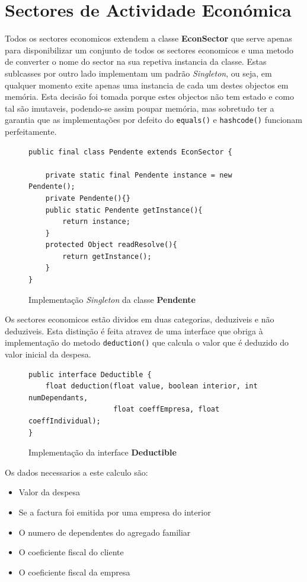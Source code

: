 \documentclass[12pt,a4paper]{report}
\begin{document}
\pagebreak

    \section{Sectores de Actividade Económica}
    Todos os sectores economicos extendem a classe \textbf{EconSector} que serve
    apenas para disponibilizar um conjunto de todos os sectores economicos e uma
    metodo de converter o nome do sector na sua repetiva instancia da classe.
    Estas sublcasses por outro lado implementam um padrão \textit{Singleton}, ou
    seja, em qualquer momento exite apenas uma instancia de cada um destes
    objectos em memória. Esta decisão foi tomada porque estes objectos não tem
    estado e como tal são imutaveis, podendo-se assim poupar memória, mas
    sobretudo ter a garantia que as implementações por defeito do
    \texttt{equals()} e \texttt{hashcode()} funcionam
    perfeitamente.
    \begin{figure}[h]
        \begin{verbatim}
public final class Pendente extends EconSector {

    private static final Pendente instance = new Pendente();
    private Pendente(){}
    public static Pendente getInstance(){
        return instance;
    }
    protected Object readResolve(){
        return getInstance();
    }
}
        \end{verbatim}
        \caption{Implementação \textit{Singleton} da classe \textbf{Pendente}}
        \label{fig:singleton}
    \end{figure}

    Os sectores economicos estão dividos em duas categorias, deduziveis
    e não deduziveis. Esta distinção é feita atravez de uma interface que
    obriga à implementação do metodo \texttt{deduction()} que calcula
    o valor que é deduzido do valor inicial da despesa.
    \begin{figure}[h]
        \begin{verbatim}
public interface Deductible {
    float deduction(float value, boolean interior, int numDependants,
                    float coeffEmpresa, float coeffIndividual);
}
        \end{verbatim}
        \caption{Implementação da interface \textbf{Deductible}}
        \label{fig:deductible}
    \end{figure}

    Os dados necessarios a este calculo são:
    \begin{itemize}
        \item Valor da despesa
        \item Se a factura foi emitida por uma empresa do interior
        \item O numero de dependentes do agregado familiar
        \item O coeficiente fiscal do cliente
        \item O coeficiente fiscal da empresa
    \end{itemize}
\end{document}
